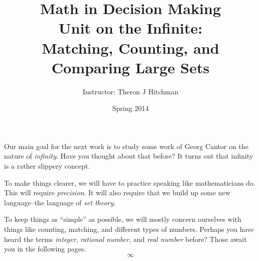 \documentclass[12pt]{article}
\begin{document}
\title{Math in Decision Making\\ Unit on the Infinite:\\
Matching, Counting, and Comparing Large Sets}
\author{Instructor: Theron J Hitchman}
\date{Spring 2014}


\maketitle

Our main goal for the next work is to study some work of Georg Cantor on the nature of \emph{infinity}. Have you thought about that before? It turns out that infinity is a rather slippery concept. 

To make things clearer, we will have to practice speaking like mathematicians do. This will require \emph{precision}. It will also require that we build up some new language--the language of \emph{set theory}.

To keep things as ``simple'' as possible, we will mostly concern ourselves with things like counting, matching, and different types of numbers. Perhaps you have heard the terms \emph{integer}, \emph{rational number}, and \emph{real number} before? Those await you in the following pages.\\

\[
\infty
\]

\newpage
$\phantom{Theron J Hitchman}$
\newpage

$\phantom{Theron J Hitchman}$
\newpage

\newpage
$\phantom{Theron J Hitchman}$
\newpage


\newpage
$\phantom{Theron J Hitchman}$
\newpage

\newpage
$\phantom{Theron J Hitchman}$
\newpage

\newpage
$\phantom{Theron J Hitchman}$
\newpage

\newpage
$\phantom{Theron J Hitchman}$
\newpage

\newpage
$\phantom{Theron J Hitchman}$
\newpage



\newpage
$\phantom{Theron J Hitchman}$
\newpage


\end{document}
